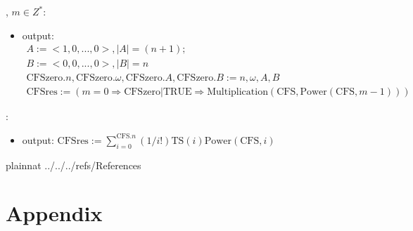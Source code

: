 \documentclass[12pt, titlepage]{article}
\begin{document}
\noindent {}, $m\in Z^{*}$\li{)}:
\begin{itemize}
	\item output: 
	\begin{gather*}
	A:=<1, 0, ..., 0>, |A|=(n+1);\\ 
	B:=<0, 0, ..., 0>, |B|=n\\
	\text{CFSzero}.n, \text{CFSzero}.\omega, \text{CFSzero}.A, \text{CFSzero}.B:=n, \omega, A, B\\
	\text{CFSres}:=(m=0\Rightarrow \text{CFSzero}|\text{TRUE}\Rightarrow \text{Multiplication}(\text{CFS}, \text{Power}(\text{CFS}, m-1)))
	\end{gather*}
\end{itemize}

\noindent {}:
\begin{itemize}
	\item output: $\text{CFSres}:=\sum_{i=0}^{\text{CFS}.n}(1/i!)\text{TS}(i)\text{Power}(\text{CFS}, i)$
\end{itemize}

\newpage

 {plainnat}
 {../../../refs/References}

\newpage

\section{Appendix} \label{Appendix}

\end{document}
